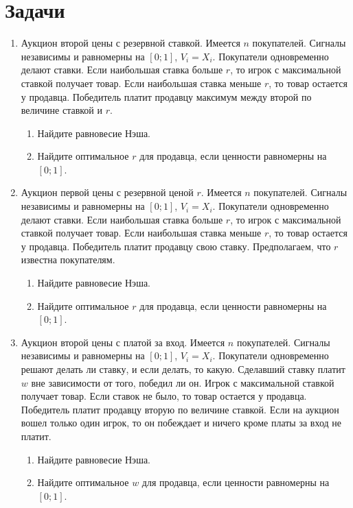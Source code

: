 \section{Задачи}
\begin{enumerate}
\item Аукцион второй цены с резервной ставкой. Имеется $ n $ покупателей.  Сигналы независимы и равномерны на $ [0;1] $, $ V_{i}=X_{i} $. Покупатели одновременно делают ставки. Если наибольшая ставка больше $ r $, то игрок с максимальной ставкой получает товар. Если наибольшая ставка меньше $ r $, то товар остается у продавца. Победитель платит продавцу максимум между второй по величине ставкой и $ r $. 
\begin{enumerate}
\item Найдите равновесие Нэша. 
\item Найдите оптимальное $ r $ для продавца, если ценности равномерны на $ [0;1] $.
\end{enumerate}


\item Аукцион первой цены с резервной ценой $ r $. Имеется $ n $ покупателей.  Сигналы независимы и равномерны на $ [0;1] $, $ V_{i}=X_{i} $. Покупатели одновременно делают ставки. Если наибольшая ставка больше $ r $, то игрок с максимальной ставкой получает товар. Если наибольшая ставка меньше $ r $, то товар остается у продавца. Победитель платит продавцу свою ставку. Предполагаем, что $ r $ известна покупателям.
\begin{enumerate}
\item Найдите равновесие Нэша. 
\item Найдите оптимальное $ r $ для продавца, если ценности равномерны на $ [0;1] $.
\end{enumerate}


\item Аукцион второй цены с платой за вход. Имеется $ n $ покупателей.  Сигналы независимы и равномерны на $ [0;1] $, $ V_{i}=X_{i} $. Покупатели одновременно решают делать ли ставку, и если делать, то какую. Сделавший ставку платит $ w $ вне зависимости от того, победил ли он. Игрок с максимальной ставкой получает товар. Если ставок не было, то товар остается у продавца. Победитель платит продавцу вторую по величине ставкой. Если на аукцион вошел только один игрок, то он побеждает и  ничего кроме платы за вход не платит.
\begin{enumerate}
\item Найдите равновесие Нэша. 
\item Найдите оптимальное $ w $ для продавца, если ценности равномерны на $ [0;1] $.
\end{enumerate}



\end{enumerate}
